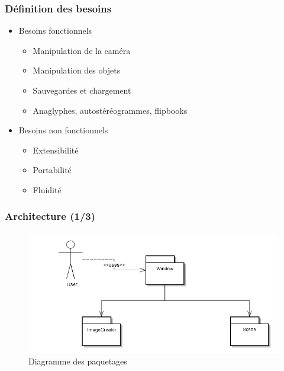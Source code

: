 \documentclass{beamer}
\begin{document}
\begin{frame}
\frametitle{Définition des besoins}
\begin{itemize}[label=$\bullet$]
\item Besoins fonctionnels
	\begin{itemize}[label=$\circ$]
	\item Manipulation de la caméra
	\item Manipulation des objets
	\item Sauvegardes et chargement
	\item Anaglyphes, autostéréogrammes, flipbooks
	\end{itemize}
\item Besoins non fonctionnels
	\begin{itemize}[label=$\circ$]
	\item Extensibilité
	\item Portabilité
	\item Fluidité
	\end{itemize}
\end{itemize}
\end{frame}


\begin{frame}
\frametitle{Architecture (1/3)}
\centering
\begin{figure}
  \includegraphics[scale=0.4]{paquetages.jpg}
  \caption{Diagramme des paquetages}
\end{figure}
\end{frame}

\end{document}
